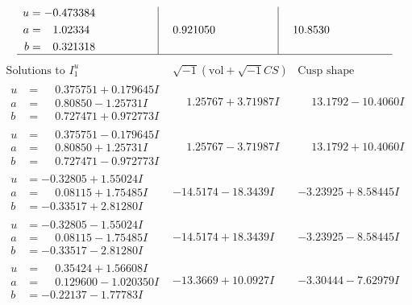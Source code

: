 \documentclass[1p]{elsarticle_modified}
\theoremstyle{definition}
\newcommand{\I}{\sqrt{-1}}
\begin{document}
$$\begin{array}{c|c|c}
\begin{aligned}
u &= -0.473384\phantom{ +0.000000I} \\
a &= \phantom{-}1.02334\phantom{ +0.000000I} \\
b &= \phantom{-}0.321318\phantom{ +0.000000I}\end{aligned}
 & \phantom{-}0.921050\phantom{ +0.000000I} & \phantom{-}10.8530\phantom{ +0.000000I}\\
 \hline 
 \end{array}$$\newpage$$\begin{array}{c|c|c}  
\text{Solutions to }I^u_{1}& \I (\text{vol} + \sqrt{-1}CS) & \text{Cusp shape}\\
 \hline 
\begin{aligned}
u &= \phantom{-}0.375751 + 0.179645 I \\
a &= \phantom{-}0.80850 - 1.25731 I \\
b &= \phantom{-}0.727471 + 0.972773 I\end{aligned}
 & \phantom{-}1.25767 + 3.71987 I & \phantom{-}13.1792 - 10.4060 I \\ \hline\begin{aligned}
u &= \phantom{-}0.375751 - 0.179645 I \\
a &= \phantom{-}0.80850 + 1.25731 I \\
b &= \phantom{-}0.727471 - 0.972773 I\end{aligned}
 & \phantom{-}1.25767 - 3.71987 I & \phantom{-}13.1792 + 10.4060 I \\ \hline\begin{aligned}
u &= -0.32805 + 1.55024 I \\
a &= \phantom{-}0.08115 + 1.75485 I \\
b &= -0.33517 + 2.81280 I\end{aligned}
 & -14.5174 - 18.3439 I & -3.23925 + 8.58445 I \\ \hline\begin{aligned}
u &= -0.32805 - 1.55024 I \\
a &= \phantom{-}0.08115 - 1.75485 I \\
b &= -0.33517 - 2.81280 I\end{aligned}
 & -14.5174 + 18.3439 I & -3.23925 - 8.58445 I \\ \hline\begin{aligned}
u &= \phantom{-}0.35424 + 1.56608 I \\
a &= \phantom{-}0.129600 - 1.020350 I \\
b &= -0.22137 - 1.77783 I\end{aligned}
 & -13.3669 + 10.0927 I & -3.30444 - 7.62979 I \\ \hline\begin{aligned}

\end{aligned}
\end{array}$$
\end{document}
